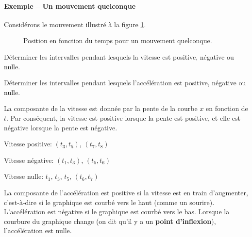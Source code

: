 \paragraph{Exemple -- Un mouvement quelconque}

Considérons le mouvement illustré à la figure \ref{fig:quelconque}.

\begin{figure}
  \begin{center}
  \end{center}
  \caption{Position en fonction du temps pour un mouvement quelconque.}
  \label{fig:quelconque}
\end{figure}

Déterminer les intervalles pendant lesquels la vitesse est positive, négative
ou nulle.

Déterminer les intervalles pendant lesquels l'accélération est positive,
négative ou nulle.

La composante de la vitesse est donnée par la pente de la courbe $x$ en
fonction de $t$.  Par conséquent, la vitesse est positive lorsque la pente est
positive, et elle est négative lorsque la pente est négative.

Vitesse positive: $(t_3, t_5)$, $(t_7, t_8)$

Vitesse négative: $(t_1, t_3)$, $(t_5, t_6)$

Vitesse nulle: $t_1$, $t_3$, $t_5$, $(t_6, t_7)$

La composante de l'accélération est positive si la vitesse est en train
d'augmenter, c'est-à-dire si le graphique est courbé vers le haut (comme un
sourire).  L'accélération est négative si le graphique est courbé vers le bas.
Lorsque la courbure du graphique change (on dit qu'il y a un
\textbf{point d'inflexion}), l'accélération est nulle.

